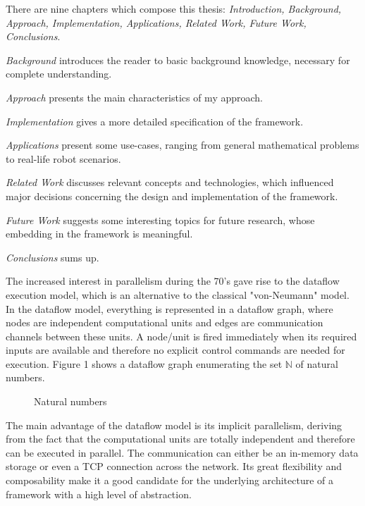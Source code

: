 \documentclass{dithesis}
\begin{document}

There are nine chapters which compose this thesis: \textit{Introduction, Background, Approach, Implementation, Applications, Related Work, Future Work, Conclusions}.

\textit{Background} introduces the reader to basic background knowledge, necessary for complete understanding.

\textit{Approach} presents the main characteristics of my approach.

\textit{Implementation} gives a more detailed specification of the framework.

\textit{Applications} present some use-cases, ranging from general mathematical problems to real-life robot scenarios.

\textit{Related Work} discusses relevant concepts and technologies, which influenced major decisions concerning the design and implementation of the framework.

\textit{Future Work} suggests some interesting topics for future research, whose embedding in the framework is meaningful.

\textit{Conclusions} sums up.


The increased interest in parallelism during the 70's gave rise to the dataflow execution model, which is an alternative to the classical "von-Neumann" model. In the dataflow model, everything is represented in a dataflow graph, where nodes are independent computational units  and edges are communication channels between these units. A node/unit is fired immediately when its required inputs are available and therefore no explicit control commands are needed for execution. Figure 1 shows a dataflow graph enumerating the set $\mathbb{N}$ of natural numbers.

\begin{figure}[h!]
	\centering
		
	\caption{Natural numbers}
\end{figure}


The main advantage of the dataflow model is its implicit parallelism, deriving from the fact that the computational units are totally independent and therefore can be executed in parallel. The communication can either be an in-memory data storage or even a TCP connection across the network. Its great flexibility and composability make it a good candidate for the underlying architecture of a framework with a high level of abstraction.
\end{document}
